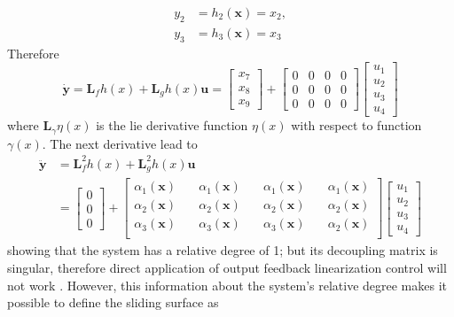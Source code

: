 \documentclass[twocolumn,10pt]{asme2e}
\begin{document}
{\begin{align}
y_2 &= h_2(\textbf{x})=x_2,\\
y_3 &= h_3(\textbf{x})=x_3\end{align}
Therefore
\begin{equation}\dot{\textbf{y}}=\textbf{L}_fh(x)+\textbf{L}_{g}h(x)\textbf{u}=\left[\begin{array}{c}
	x_7\\
	x_8\\
	x_9
\end{array}\right]+\left[\begin{array}{cccc}
0&0&0&0\\
0&0&0&0\\
0&0&0&0
\end{array}\right]\left[\begin{array}{c}
u_1\\
u_2\\
u_3\\
u_4
\end{array}\right]
\end{equation}
where $\textbf{L}_\gamma \eta(x)$ is the lie derivative function $\eta(x)$ with respect to function $\gamma(x).$ 
The next derivative lead to
\begin{align}\ddot{\textbf{y}}&=\textbf{L}_f^2h(x)+\textbf{L}_{g}^2h(x)\textbf{u}\label{eq34}\\
	&=\left[\begin{array}{c}
	0\\
	0\\
	0
\end{array}\right]+\left[\begin{array}{cccc}
	\alpha_1(\textbf{x})\quad&\alpha_1(\textbf{x})\quad&\alpha_1(\textbf{x})\quad&\alpha_1(\textbf{x})\\
\alpha_2(\textbf{x})\quad&\alpha_2(\textbf{x})\quad&\alpha_2(\textbf{x})\quad&\alpha_2(\textbf{x})\\
\alpha_3(\textbf{x})\quad&\alpha_3(\textbf{x})\quad&\alpha_3(\textbf{x})\quad&\alpha_2(\textbf{x})\\
\end{array}\right]\left[\begin{array}{c}
u_1\\
u_2\\
u_3\\
u_4
\end{array}\right]
	\end{align}
showing that the system has a relative degree of 1; but its decoupling matrix is singular, therefore direct application of output feedback linearization control will not work \cite{isidori1995nonlinear}. However, this information about the system's relative degree makes it possible to define the sliding surface as\cite{slotine1991applied}
}
\end{document}
